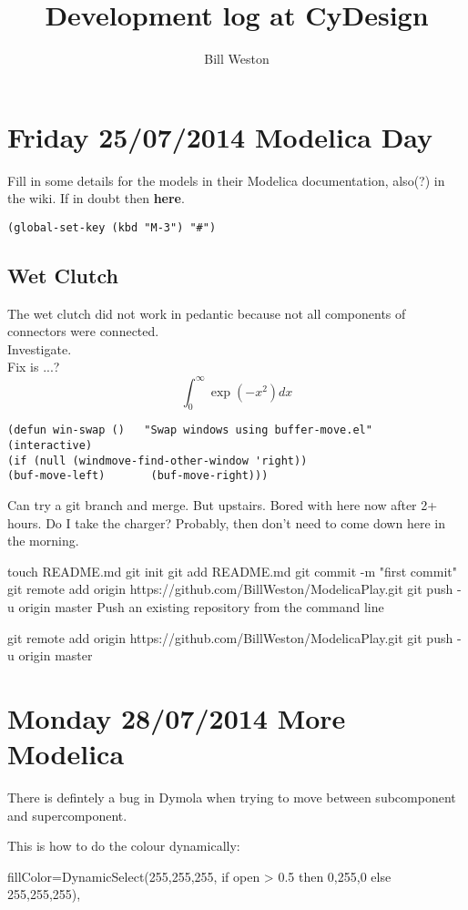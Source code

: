 \documentclass[11pt, oneside]{article}   	%
\title{Development log at CyDesign}
\author{Bill Weston}
\begin{document}
\maketitle
\section{Friday 25/07/2014  Modelica Day}

Fill in some details for the models in their Modelica documentation, also(?) in the wiki.
If in doubt then {\bf here}.

\verb+(global-set-key (kbd "M-3") "#")+
\subsection{Wet Clutch}
The wet clutch did not work in pedantic because not all components of connectors were connected.\\
Investigate.\\
Fix is ...?
$$ \int_0^{\infty}\exp(-x^2) dx $$

\begin{verbatim}
(defun win-swap ()   "Swap windows using buffer-move.el"   (interactive)     
(if (null (windmove-find-other-window 'right))         
(buf-move-left)       (buf-move-right)))
\end{verbatim}

Can try a git branch and merge.
But upstairs.  Bored with here now after 2+ hours.
Do I take the charger?  Probably, then don't need to come down here in the morning.

touch README.md
git init
git add README.md
git commit -m "first commit"
git remote add origin https://github.com/BillWeston/ModelicaPlay.git
git push -u origin master
Push an existing repository from the command line

git remote add origin https://github.com/BillWeston/ModelicaPlay.git
git push -u origin master


\section{Monday 28/07/2014  More Modelica}

There is defintely a bug in Dymola when trying to move between
subcomponent and supercomponent.

This is how to do the colour dynamically:

       fillColor=DynamicSelect({255,255,255}, if open > 0.5 then {0,255,0} else 
                    {255,255,255}),
\end{document}
